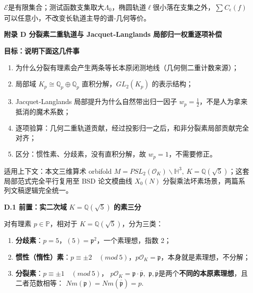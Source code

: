 \documentclass[11pt,a4paper]{ctexart}
\begin{document}
\(\mathcal{E}\)是有限集合；测试函数支集取大\(\Lambda_{0}\)，椭圆轨道\(\ell\)很小落在支集之外，\(\sum_{}^{}C_{\epsilon}(f)\)可以任意小，不改变长轨道主导的谱‑几何等价。

\textbf{附录 D 分裂素二重轨道与 Jacquet‑Langlands 局部归一权重逐项补偿}

\textbf{目标：说明下面这几件事}

\begin{enumerate}
\def\labelenumi{\arabic{enumi}.}
\item
  为什么分裂有理素会产生两条等长本原闭测地线（几何侧二重计数来源）；
\item
  局部域 \(K_{p} \cong \mathbb{Q}_{p} \oplus \mathbb{Q}_{p}\)
  直积分解，\({GL}_{2}\left( K_{p} \right)\) 的表示结构；
\item
  Jacquet‑Langlands 局部提升为什么自然带出归一因子
  \(w_{p} = \frac{1}{2}\)，不是人为拿来抵消的魔术系数；
\item
  逐项验算：几何二重轨道贡献，经过投影归一之后，和非分裂素局部贡献完全对齐；
\item
  区分：惯性素、分歧素，没有直积分解，故 \(w_{p} = 1\)，不需要修正。
\end{enumerate}

适用上下文：本文三维算术 orbifold
\(M = {PSL}_{2}\left( \mathcal{O}_{K} \right)\backslash\mathbb{H}^{3},\ K\mathbb{= Q}\left( \sqrt{5} \right)\)；这套局部范式完全平行复用至
BSD 论文模曲线 \(X_{0}(N)\) 分裂乘法坏素场景，两篇系列文稿逻辑完全统一。

\textbf{D.1 前置：实二次域} \(K = \mathbb{Q}\left( \sqrt{5} \right)\)
\textbf{的素三分}

对有理素 \(p \in \mathbb{P}\)，相对于
\(K = \mathbb{Q}\left( \sqrt{5} \right)\)，分为三类：

\begin{enumerate}
\def\labelenumi{\arabic{enumi}.}
\item
  \textbf{分歧素}：\(p = 5\)，\((5) = \mathfrak{p}^{2}\)，一个素理想，指数
  2；
\item
  \textbf{惯性（惰性）素}：\(p \equiv \pm 2\quad(mod\ 5)\)，\(p\mathcal{O}_{K} = \mathfrak{p}\)，本身就是素理想，不分解；
\item
  \textbf{分裂素}：\(p \equiv \pm 1\quad(mod\ 5)\)，
  \(p\mathcal{O}_{K} = \mathfrak{p} \cdot \overline{\mathfrak{p}},\)
  \(\mathfrak{p},\overline{\mathfrak{p}}\)是两个\textbf{不同的本原素理想}，且二者范数相等：
  \(Nm\left( \mathfrak{p} \right) = Nm\left( \overline{\mathfrak{p}} \right) = p.\)
\end{enumerate}
\end{document}
